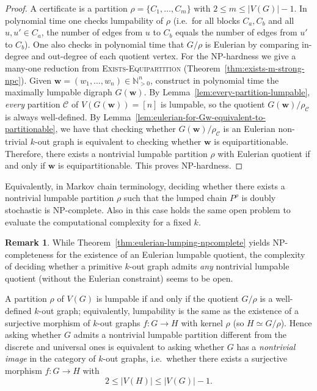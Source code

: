 \documentclass[a4paper,10pt]{amsart}
\theoremstyle{plain}
\theoremstyle{definition}
\newtheorem{remark}[theorem]{Remark}
\begin{document}
\begin{proof}
A certificate is a partition $\rho=\{C_1,\dots,C_m\}$ with $2\le m\le |V(G)|-1$. In polynomial time one checks lumpability of $\rho$ (i.e.\ for all blocks $C_a,C_b$ and all $u,u'\in C_a$, the number of edges from $u$ to $C_b$ equals the number of edges from $u'$ to $C_b$). One also checks in polynomial time that $G/\rho$ is Eulerian by comparing in-degree and out-degree of each quotient vertex. For the NP-hardness we give a many-one reduction from \textsc{Exists-Equipartition} (Theorem~\ref{thm:exists-m-strong-npc}). Given $\mathbf w=(w_1,\dots,w_n)\in\mathbb N_{>0}^n$, construct in polynomial time the maximally lumpable digraph
$G(\mathbf w)$. By Lemma~\ref{lem:every-partition-lumpable}, \emph{every} partition $\mathcal C$ of $V(G(\mathbf w))=[n]$ is lumpable,
so the quotient $G(\mathbf w)/\rho_{\mathcal C}$ is always well-defined. By Lemma~\ref{lem:eulerian-for-Gw-equivalent-to-partitionable}, we have that checking whether $G(\mathbf w)/\rho_{\mathcal C}$ is an Eulerian non-trivial $k$-out graph is equivalent to checking whether $\mathbf w$ is equipartitionable. Therefore, there exists a nontrivial lumpable partition $\rho$ with Eulerian quotient if and only if $\mathbf w$ is equipartitionable. This proves NP-hardness.
\end{proof}
Equivalently, in Markov chain terminology, deciding whether there exists a nontrivial lumpable partition $\rho$ such that the lumped chain $P^\rho$ is doubly stochastic is NP-complete. Also in this case holds the same open problem to evaluate the computational complexity for a fixed $k$. 
\begin{remark}
While Theorem~\ref{thm:eulerian-lumping-npcomplete} yields NP-completeness for the existence of an Eulerian lumpable quotient,
the complexity of deciding whether a primitive $k$-out graph admits \emph{any} nontrivial lumpable quotient (without the
Eulerian constraint) seems to be open.
\end{remark}
A partition $\rho$ of $V(G)$ is lumpable if and only if the quotient $G/\rho$ is a well-defined $k$-out graph; equivalently, lumpability is the same as the existence of a surjective morphism of $k$-out graphs
$f:G\to H$ with kernel $\rho$ (so $H\simeq G/\rho$).
Hence asking whether $G$ admits a nontrivial lumpable partition different from the discrete and universal ones is
equivalent to asking whether $G$ has a \emph{nontrivial image} in the category of $k$-out graphs, i.e.\ whether there exists
a surjective morphism $f:G\to H$ with
\[
2\le |V(H)|\le |V(G)|-1.
\]
\end{document}
